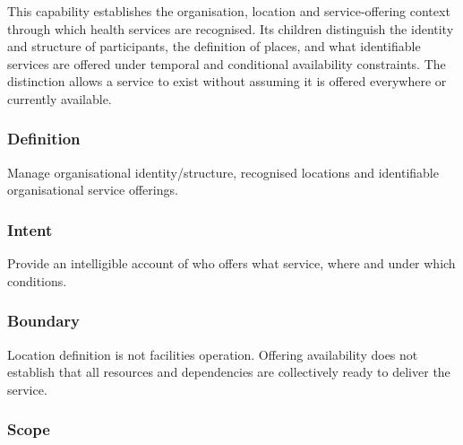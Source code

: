 This capability establishes the organisation, location and service-offering context through which health services are recognised. Its children distinguish the identity and structure of participants, the definition of places, and what identifiable services are offered under temporal and conditional availability constraints. The distinction allows a service to exist without assuming it is offered everywhere or currently available.

\subsubsection*{Definition}

Manage organisational identity/\allowbreak{}structure, recognised locations and identifiable organisational service offerings.

\subsubsection*{Intent}

Provide an intelligible account of who offers what service, where and under which conditions.

\subsubsection*{Boundary}

Location definition is not facilities operation. Offering availability does not establish that all resources and dependencies are collectively ready to deliver the service.

\subsubsection*{Scope}

